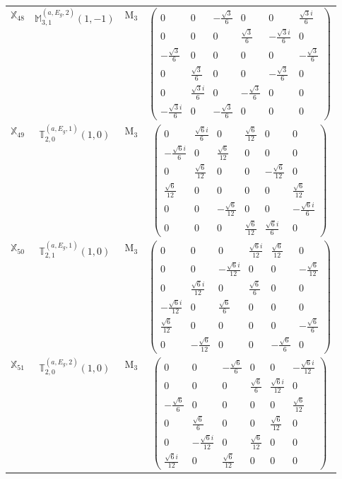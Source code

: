 \documentclass[fleqn,10pt,landscape]{article}
\begin{document}
\begin{itemize}
\begin{center}
\begin{longtable}{c|c|c|c}
$ \mathbb{X}_{48} $ & $\mathbb{M}_{3,1}^{(a,E_{g},2)}(1,-1)$ & M$_{3}$ & $\begin{pmatrix} 0 & 0 & - \frac{\sqrt{3}}{6} & 0 & 0 & \frac{\sqrt{3} i}{6} \\ 0 & 0 & 0 & \frac{\sqrt{3}}{6} & - \frac{\sqrt{3} i}{6} & 0 \\ - \frac{\sqrt{3}}{6} & 0 & 0 & 0 & 0 & - \frac{\sqrt{3}}{6} \\ 0 & \frac{\sqrt{3}}{6} & 0 & 0 & - \frac{\sqrt{3}}{6} & 0 \\ 0 & \frac{\sqrt{3} i}{6} & 0 & - \frac{\sqrt{3}}{6} & 0 & 0 \\ - \frac{\sqrt{3} i}{6} & 0 & - \frac{\sqrt{3}}{6} & 0 & 0 & 0 \end{pmatrix}$ \\
$ \mathbb{X}_{49} $ & $\mathbb{T}_{2,0}^{(a,E_{g},1)}(1,0)$ & M$_{3}$ & $\begin{pmatrix} 0 & \frac{\sqrt{6} i}{6} & 0 & \frac{\sqrt{6}}{12} & 0 & 0 \\ - \frac{\sqrt{6} i}{6} & 0 & \frac{\sqrt{6}}{12} & 0 & 0 & 0 \\ 0 & \frac{\sqrt{6}}{12} & 0 & 0 & - \frac{\sqrt{6}}{12} & 0 \\ \frac{\sqrt{6}}{12} & 0 & 0 & 0 & 0 & \frac{\sqrt{6}}{12} \\ 0 & 0 & - \frac{\sqrt{6}}{12} & 0 & 0 & - \frac{\sqrt{6} i}{6} \\ 0 & 0 & 0 & \frac{\sqrt{6}}{12} & \frac{\sqrt{6} i}{6} & 0 \end{pmatrix}$ \\
$ \mathbb{X}_{50} $ & $\mathbb{T}_{2,1}^{(a,E_{g},1)}(1,0)$ & M$_{3}$ & $\begin{pmatrix} 0 & 0 & 0 & \frac{\sqrt{6} i}{12} & \frac{\sqrt{6}}{12} & 0 \\ 0 & 0 & - \frac{\sqrt{6} i}{12} & 0 & 0 & - \frac{\sqrt{6}}{12} \\ 0 & \frac{\sqrt{6} i}{12} & 0 & \frac{\sqrt{6}}{6} & 0 & 0 \\ - \frac{\sqrt{6} i}{12} & 0 & \frac{\sqrt{6}}{6} & 0 & 0 & 0 \\ \frac{\sqrt{6}}{12} & 0 & 0 & 0 & 0 & - \frac{\sqrt{6}}{6} \\ 0 & - \frac{\sqrt{6}}{12} & 0 & 0 & - \frac{\sqrt{6}}{6} & 0 \end{pmatrix}$ \\
$ \mathbb{X}_{51} $ & $\mathbb{T}_{2,0}^{(a,E_{g},2)}(1,0)$ & M$_{3}$ & $\begin{pmatrix} 0 & 0 & - \frac{\sqrt{6}}{6} & 0 & 0 & - \frac{\sqrt{6} i}{12} \\ 0 & 0 & 0 & \frac{\sqrt{6}}{6} & \frac{\sqrt{6} i}{12} & 0 \\ - \frac{\sqrt{6}}{6} & 0 & 0 & 0 & 0 & \frac{\sqrt{6}}{12} \\ 0 & \frac{\sqrt{6}}{6} & 0 & 0 & \frac{\sqrt{6}}{12} & 0 \\ 0 & - \frac{\sqrt{6} i}{12} & 0 & \frac{\sqrt{6}}{12} & 0 & 0 \\ \frac{\sqrt{6} i}{12} & 0 & \frac{\sqrt{6}}{12} & 0 & 0 & 0 \end{pmatrix}$ \\

\end{longtable}
\end{center}
\end{itemize}
\end{document}
